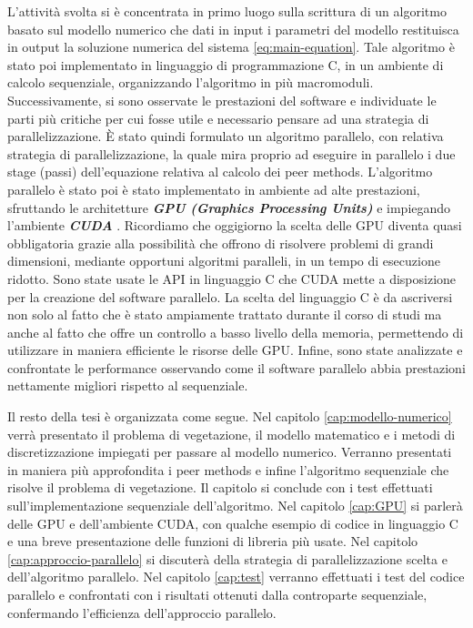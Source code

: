 \noindent L'attività svolta si è concentrata in primo luogo sulla scrittura di un algoritmo basato sul modello numerico che dati in input i parametri del modello restituisca in output la soluzione numerica del sistema \eqref{eq:main-equation}. Tale algoritmo è stato poi implementato in linguaggio di programmazione C, in un ambiente di calcolo sequenziale, organizzando l'algoritmo in più macromoduli.
\noindent Successivamente, si sono osservate le prestazioni del software e individuate le parti più critiche per cui fosse utile e necessario pensare ad una strategia di parallelizzazione. È stato quindi formulato un algoritmo parallelo, con relativa strategia di parallelizzazione, la quale mira proprio ad eseguire in parallelo i due stage (passi) dell'equazione relativa al calcolo dei peer methods. L'algoritmo parallelo è stato poi è stato implementato in ambiente ad alte prestazioni, sfruttando le architetture \textit{\textbf{GPU (Graphics Processing Units)}} e impiegando l'ambiente \textit{\textbf{CUDA}} \cite{cuda-environment}. 
Ricordiamo che oggigiorno la scelta delle GPU diventa quasi obbligatoria grazie alla possibilità che offrono di risolvere problemi di grandi dimensioni, mediante opportuni algoritmi paralleli, in un tempo di esecuzione ridotto.
Sono state usate le API in linguaggio C che CUDA mette a disposizione per la creazione del software parallelo. La scelta del linguaggio C è da ascriversi non solo al fatto che è stato ampiamente trattato durante il corso di studi ma anche al fatto che offre un controllo a basso livello della memoria, permettendo di utilizzare in maniera efficiente le risorse delle GPU. Infine, sono state analizzate e confrontate le performance osservando come il software parallelo abbia prestazioni nettamente migliori rispetto al sequenziale.

\noindent Il resto della tesi è organizzata come segue. Nel capitolo \ref{cap:modello-numerico} verrà presentato il problema di vegetazione, il modello matematico e i metodi di discretizzazione impiegati per passare al modello numerico. Verranno presentati in maniera più approfondita i peer methods e infine l'algoritmo sequenziale che risolve il problema di vegetazione. Il capitolo si conclude con i test effettuati sull'implementazione sequenziale dell'algoritmo. Nel capitolo \ref{cap:GPU} si parlerà delle GPU e dell'ambiente CUDA, con qualche esempio di codice in linguaggio C e una breve presentazione delle funzioni di libreria più usate. Nel capitolo \ref{cap:approccio-parallelo} si discuterà della strategia di parallelizzazione scelta e dell'algoritmo parallelo. Nel capitolo \ref{cap:test} verranno effettuati i test del codice parallelo e confrontati con i risultati ottenuti dalla controparte sequenziale, confermando l'efficienza dell'approccio parallelo.

\newpage